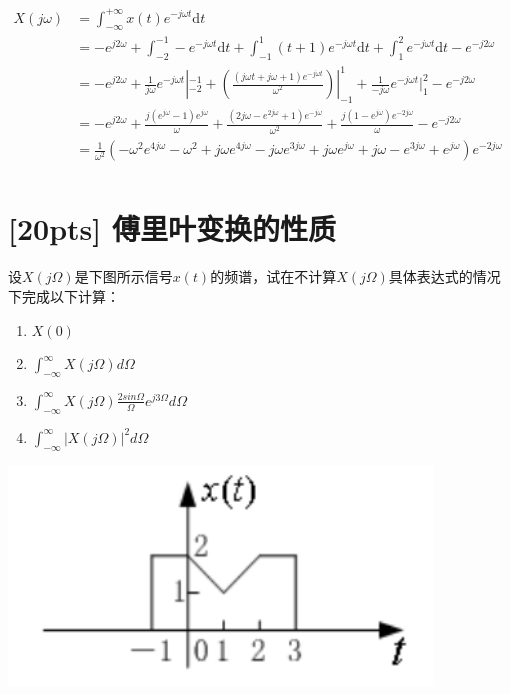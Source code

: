 \documentclass[a4paper,UTF8]{article}
\numberwithin{equation}{section}
\begin{document}
\begin{framed}
\begin{spacing}{1.5}
\begin{itemize}
      $
      \begin{aligned}
      X(j\omega) &= \int_{-\infty}^{+\infty}x(t)e^{-j\omega t}\mathrm{d}t  \\
      &= -e^{j 2\omega} + \int_{-2}^{-1}-e^{-j\omega t}\mathrm{d}t + \int_{-1}^{1}(t+1)e^{-j\omega t}\mathrm{d}t + \int_{1}^{2}e^{-j\omega t}\mathrm{d}t - e^{-j 2\omega}  \\
      &= -e^{j 2\omega} + \frac{1}{j\omega}e^{-j\omega t}|_{-2}^{-1} + (\frac{(j \omega t + j \omega + 1) e^{- j \omega t}}{\omega^{2}})|_{-1}^{1} + \frac{1}{-j\omega}e^{-j\omega t}|_{1}^{2} - e^{-j 2\omega}  \\
      &= -e^{j 2\omega} + \frac{j (e^{j \omega} - 1) e^{j \omega}}{\omega} + \frac{(2 j \omega - e^{2 j \omega} + 1) e^{- j \omega}}{\omega^{2}} + \frac{j (1 - e^{j \omega}) e^{- 2 j \omega}}{\omega} - e^{-j 2\omega}  \\
      &= \frac{1}{\omega^{2}}(- \omega^{2} e^{4 j \omega} - \omega^{2} + j \omega e^{4 j \omega} - j \omega e^{3 j \omega} + j \omega e^{j \omega} + j \omega - e^{3 j \omega} + e^{j \omega}) e^{- 2 j \omega}  \\
      \end{aligned}
      $
    \end{itemize}
\end{spacing}
\end{framed}


\newpage
\section{[20pts] 傅里叶变换的性质 }
设$X(j\Omega)$是下图所示信号$x(t)$的频谱，试在不计算$X(j\Omega)$具体表达式的情况下完成以下计算：
\begin{enumerate}[(1)]
	\item $X(0)$
	\item $\displaystyle\int^{\infty}_{-\infty}X(j\Omega)d\Omega$
	\item $\displaystyle\int^{\infty}_{-\infty}X(j\Omega)\frac{2sin\Omega}{\Omega}e^{j3\Omega}d\Omega$
	\item $\displaystyle\int^{\infty}_{-\infty}\left|X(j\Omega)\right|^2d\Omega$
\end{enumerate}
\includegraphics[scale=0.4]{3.png}
\end{document}
